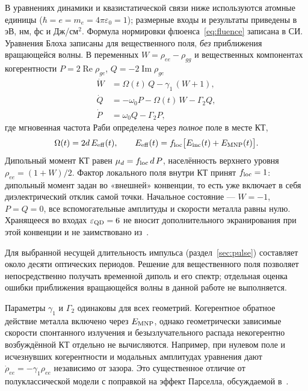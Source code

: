 В уравнениях динамики и квазистатической связи ниже используются атомные
единицы ($\hbar=e=m_e=4\pi\varepsilon_0=1$); размерные входы и результаты
приведены в эВ, нм, фс и Дж/см$^2$. Формула нормировки
флюенса~\eqref{eq:fluence} записана в СИ.
Уравнения Блоха записаны для вещественного поля, \emph{без} приближения
вращающейся волны. В переменных $W=\rho_{ee}-\rho_{gg}$ и вещественных
компонентах когерентности $P=2\operatorname{Re}\rho_{ge}$,
$Q=-2\operatorname{Im}\rho_{ge}$
\begin{align}
  \dot W &= \Omega(t)\,Q - \gamma_1\,(W+1), \label{eq:bloch-w}\\
  \dot Q &= -\omega_0 P - \Omega(t)\,W - \Gamma_2 Q, \label{eq:bloch-q}\\
  \dot P &= \omega_0 Q - \Gamma_2 P, \label{eq:bloch-p}
\end{align}
где мгновенная частота Раби определена через \emph{полное} поле в месте КТ,
\begin{equation}
  \Omega(t) = 2 d\,E_{\rm eff}(t),
  \qquad
  E_{\rm eff}(t) = f_{\rm loc}\bigl[E_{\rm inc}(t) + E_{\rm MNP}(t)\bigr].
  \label{eq:rabi}
\end{equation}
Дипольный момент КТ равен $\mu_d = f_{\rm loc}\,d\,P$, населённость верхнего
уровня $\rho_{ee}=(1+W)/2$. Фактор локального поля внутри КТ принят
$f_{\rm loc}=1$: дипольный момент задан во «внешней» конвенции, то есть уже
включает в себя диэлектрический отклик самой точки.
Начальное состояние --- $W=-1$, $P=Q=0$, все вспомогательные
амплитуды и скорости металла равны нулю. Хранящееся во входах
$\varepsilon_{\rm QD}=6$ не вносит дополнительного экранирования
при этой конвенции и не заимствовано из~\cite{shah2013}.

Для выбранной несущей длительность импульса
(раздел~\ref{sec:pulse}) составляет около десяти оптических периодов.
Решение для вещественного поля позволяет непосредственно получать
временной диполь и его спектр; отдельная оценка ошибки приближения
вращающейся волны в данной работе не выполняется.

Параметры $\gamma_1$ и $\Gamma_2$ одинаковы для всех геометрий.
Когерентное обратное действие металла включено через $E_{\rm MNP}$,
однако геометрически зависимые скорости спонтанного излучения
и безызлучательного распада некогерентно возбуждённой КТ отдельно
не вычисляются. Например, при нулевом поле и исчезнувших когерентности
и модальных амплитудах уравнения дают $\dot\rho_{ee}=-\gamma_1\rho_{ee}$
независимо от зазора. Это существенное отличие от полуклассической модели
с поправкой на эффект Парселла, обсуждаемой в~\cite{shah2013}.

